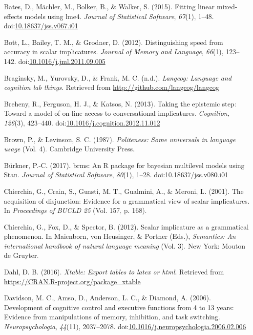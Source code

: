 \documentclass[man]{apa6}
\theoremstyle{definition}
\theoremstyle{definition}
\theoremstyle{definition}
\theoremstyle{remark}
\begin{document}
\hypertarget{ref-R-lme4}{}
Bates, D., Mächler, M., Bolker, B., \& Walker, S. (2015). Fitting linear
mixed-effects models using lme4. \emph{Journal of Statistical Software},
\emph{67}(1), 1--48.
doi:\href{https://doi.org/10.18637/jss.v067.i01}{10.18637/jss.v067.i01}

\hypertarget{ref-bott2012}{}
Bott, L., Bailey, T. M., \& Grodner, D. (2012). Distinguishing speed
from accuracy in scalar implicatures. \emph{Journal of Memory and
Language}, \emph{66}(1), 123--142.
doi:\href{https://doi.org/10.1016/j.jml.2011.09.005}{10.1016/j.jml.2011.09.005}

\hypertarget{ref-R-langcog}{}
Braginsky, M., Yurovsky, D., \& Frank, M. C. (n.d.). \emph{Langcog:
Language and cognition lab things}. Retrieved from
\url{http://github.com/langcog/langcog}

\hypertarget{ref-breheny2013}{}
Breheny, R., Ferguson, H. J., \& Katsos, N. (2013). Taking the epistemic
step: Toward a model of on-line access to conversational implicatures.
\emph{Cognition}, \emph{126}(3), 423--440.
doi:\href{https://doi.org/10.1016/j.cognition.2012.11.012}{10.1016/j.cognition.2012.11.012}

\hypertarget{ref-brown1987}{}
Brown, P., \& Levinson, S. C. (1987). \emph{Politeness: Some universals
in language usage} (Vol. 4). Cambridge University Press.

\hypertarget{ref-R-brms}{}
Bürkner, P.-C. (2017). brms: An R package for bayesian multilevel models
using Stan. \emph{Journal of Statistical Software}, \emph{80}(1), 1--28.
doi:\href{https://doi.org/10.18637/jss.v080.i01}{10.18637/jss.v080.i01}

\hypertarget{ref-chierchia2001}{}
Chierchia, G., Crain, S., Guasti, M. T., Gualmini, A., \& Meroni, L.
(2001). The acquisition of disjunction: Evidence for a grammatical view
of scalar implicatures. In \emph{Proceedings of BUCLD 25} (Vol. 157, p.
168).

\hypertarget{ref-chierchia2012}{}
Chierchia, G., Fox, D., \& Spector, B. (2012). Scalar implicature as a
grammatical phenomenon. In Maienborn, von Heusinger, \& Portner (Eds.),
\emph{Semantics: An international handbook of natural language meaning}
(Vol. 3). New York: Mouton de Gruyter.

\hypertarget{ref-R-xtable}{}
Dahl, D. B. (2016). \emph{Xtable: Export tables to latex or html}.
Retrieved from \url{https://CRAN.R-project.org/package=xtable}

\hypertarget{ref-davidson2006}{}
Davidson, M. C., Amso, D., Anderson, L. C., \& Diamond, A. (2006).
Development of cognitive control and executive functions from 4 to 13
years: Evidence from manipulations of memory, inhibition, and task
switching. \emph{Neuropsychologia}, \emph{44}(11), 2037--2078.
doi:\href{https://doi.org/10.1016/j.neuropsychologia.2006.02.006}{10.1016/j.neuropsychologia.2006.02.006}
\end{document}
